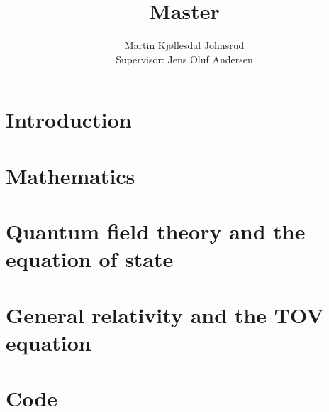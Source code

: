\documentclass{book}
\title{\huge{Master}}
\author{
    \large{Martin Kjøllesdal Johnsrud }\\
    \normalsize{Supervisor: Jens Oluf Andersen}
    }
\begin{document}
    \maketitle
    \listoftodos
    \clearpage
    \tableofcontents

    \setlength{\parindent}{0em}
    \setlength{\parskip}{0.8em}

    \chapter{Introduction}
    \label{chapter: introduction}
    


    \chapter{Mathematics}
    \label{chapter: math}
    
    


    \chapter{Quantum field theory and the equation of state}
    

    \chapter{General relativity and the TOV equation}
    \label{chapter: GR}
    
    
    

    \appendix

    \chapter[Appendix A]{}
    

    
    \chapter{Code}
    


    \printbibliography
\end{document}
